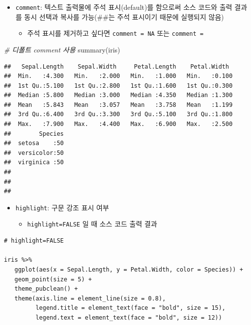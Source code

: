 \documentclass[
  11pt,
]{krantz}
\newenvironment{Shaded}{\begin{snugshade}}{\end{snugshade}}
\newcommand{\CommentTok}[1]{\textcolor[rgb]{0.37,0.37,0.37}{\textit{#1}}}
\newcommand{\FunctionTok}[1]{\textcolor[rgb]{0,0,0}{#1}}
\newcommand{\NormalTok}[1]{#1}
\providecommand{\tightlist}{%
  \setlength{\itemsep}{0pt}\setlength{\parskip}{0pt}}
\begin{document}
\normalsize

\begin{itemize}
\tightlist
\item
  \texttt{comment}: 텍스트 출력물에 주석 표시(default)를 함으로써 소스 코드와 출력 결과를 동시 선택과 복사를 가능(\#\#는 주석 표시이기 때문에 실행되지 않음)

  \begin{itemize}
  \tightlist
  \item
    주석 표시를 제거하고 싶다면 \texttt{comment\ =\ NA} 또는 \texttt{comment\ =\ \textquotesingle{}\textquotesingle{}}
  \end{itemize}
\end{itemize}

\footnotesize

\begin{Shaded}
\begin{Highlighting}[]
\CommentTok{\# 디폴트 comment 사용}
\FunctionTok{summary}\NormalTok{(iris)}
\end{Highlighting}
\end{Shaded}

\begin{verbatim}
##   Sepal.Length    Sepal.Width     Petal.Length    Petal.Width   
##  Min.   :4.300   Min.   :2.000   Min.   :1.000   Min.   :0.100  
##  1st Qu.:5.100   1st Qu.:2.800   1st Qu.:1.600   1st Qu.:0.300  
##  Median :5.800   Median :3.000   Median :4.350   Median :1.300  
##  Mean   :5.843   Mean   :3.057   Mean   :3.758   Mean   :1.199  
##  3rd Qu.:6.400   3rd Qu.:3.300   3rd Qu.:5.100   3rd Qu.:1.800  
##  Max.   :7.900   Max.   :4.400   Max.   :6.900   Max.   :2.500  
##        Species  
##  setosa    :50  
##  versicolor:50  
##  virginica :50  
##                 
##                 
## 
\end{verbatim}

\normalsize

\begin{itemize}
\tightlist
\item
  \texttt{highlight}: 구문 강조 표시 여부

  \begin{itemize}
  \tightlist
  \item
    \texttt{highlight=FALSE} 일 때 소스 코드 출력 결과
  \end{itemize}
\end{itemize}

\footnotesize

\begin{verbatim}
# highlight=FALSE

iris %>%
   ggplot(aes(x = Sepal.Length, y = Petal.Width, color = Species)) +
   geom_point(size = 5) +
   theme_pubclean() +
   theme(axis.line = element_line(size = 0.8),
         legend.title = element_text(face = "bold", size = 15),
         legend.text = element_text(face = "bold", size = 12))
\end{verbatim}
\end{document}
